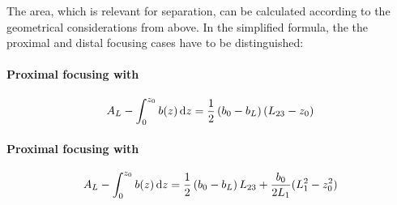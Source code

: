 The area, which is relevant for separation, can be calculated according to the geometrical considerations from above.
In the simplified formula, the the proximal and distal focusing cases have to be distinguished:
\paragraph{Proximal focusing with }
\begin{equation}
  A_L -  \int_{0}^{z_0} b(z) \mathop{}\!\mathrm{d} z = 
  \frac{1}{2}
  \left( b_0 - b_L  \right)
  \left( L_{23} - z_0 \right) 
\end{equation}

\paragraph{Proximal focusing with }
\begin{equation}
  A_L -  \int_{0}^{z_0} b(z) \mathop{}\!\mathrm{d} z = 
  \frac{1}{2}
 \left( b_0 - b_L  \right)  L_{23}
  + \frac{b_0}{2 L_1}  (L_1^2-z_0^2)
\end{equation}
